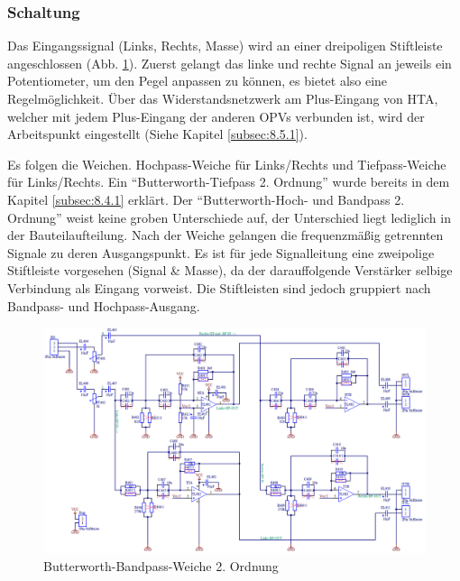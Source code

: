 \subsubsection{Schaltung}\label{subsec:5.4.2}
Das Eingangssignal (Links, Rechts, Masse) wird an einer dreipoligen Stiftleiste angeschlossen (Abb. \ref{fig:5.4.2.1}).
Zuerst gelangt das linke und rechte Signal an jeweils ein Potentiometer, um den Pegel anpassen zu können, es bietet also eine Regelmöglichkeit.
Über das Widerstandsnetzwerk am Plus-Eingang von HTA, welcher mit jedem Plus-Eingang der anderen OPVs verbunden ist, wird der Arbeitspunkt eingestellt (Siehe Kapitel \ref{subsec:8.5.1}). 

\newpage
Es folgen die Weichen.
Hochpass-Weiche für Links/Rechts und Tiefpass-Weiche für Links/Rechts.
Ein \enquote{Butterworth-Tiefpass 2. Ordnung} wurde bereits in dem Kapitel \ref{subsec:8.4.1} erklärt.
Der \enquote{Butterworth-Hoch- und Bandpass 2. Ordnung} weist keine groben Unterschiede auf, der Unterschied liegt lediglich in der Bauteilaufteilung.
Nach der Weiche gelangen die frequenzmäßig getrennten Signale zu deren Ausgangspunkt. Es ist für jede Signalleitung eine zweipolige Stiftleiste vorgesehen (Signal \& Masse), da der darauffolgende Verstärker selbige Verbindung als Eingang vorweist.
Die Stiftleisten sind jedoch gruppiert nach Bandpass- und Hochpass-Ausgang.
\begin{figure} [H]
	\centering	
	\includegraphics[width=1\textwidth]{img/Print4/4_TTuHTWeiche-Schematic.PNG}
	\caption{Butterworth-Bandpass-Weiche 2. Ordnung}
	\label {fig:5.4.2.1}
\end{figure}


